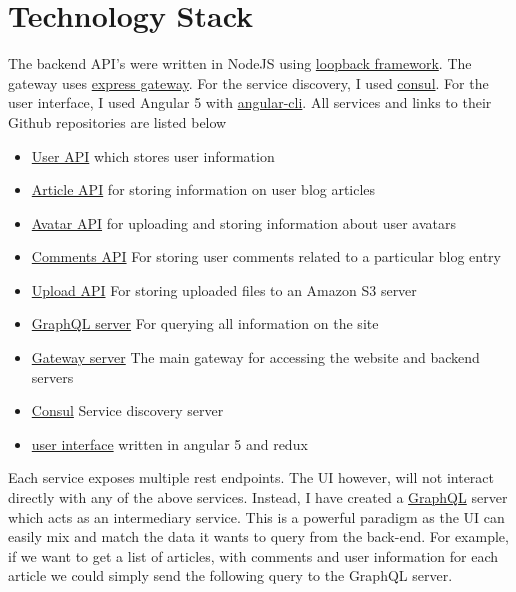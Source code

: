 \section{Technology Stack}

The backend API's were written in NodeJS using \href{https://loopback.io}{loopback framework}. The gateway uses \href{https://www.express-gateway.io/}{express gateway}. For the service discovery, I used \href{https://www.consul.io/}{consul}. For the user interface, I used Angular 5 with \href{https://cli.angular.io/}{angular-cli}. All services and links to their Github repositories are listed below

\begin{itemize}
  \item \href{https://github.com/msc-blog-assignment/msc-blog-user-api}{User API} which stores user information
  \item \href{https://github.com/msc-blog-assignment/msc-blog-article-api}{Article API} for storing information on user blog articles
  \item \href{https://github.com/msc-blog-assignment/msc-blog-avatar-api}{Avatar API} for uploading and storing information about user avatars
  \item \href{https://github.com/msc-blog-assignment/msc-blog-comments-api}{Comments API} For storing user comments related to a particular blog entry
  \item \href{https://github.com/msc-blog-assignment/msc-blog-upload-api}{Upload API} For storing uploaded files to an Amazon S3 server
  \item \href{https://github.com/msc-blog-assignment/msc-blog-graphql}{GraphQL server} For querying all information on the site
  \item \href{https://github.com/msc-blog-assignment/msc-blog-gateway}{Gateway server} The main gateway for accessing the website and backend servers
  \item \href{https://github.com/msc-blog-assignment/msc-blog-consul}{Consul} Service discovery server
  \item \href{https://github.com/msc-blog-assignment/msc-blog-ui}{user interface} written in angular 5 and redux
\end{itemize}
Each service exposes multiple rest endpoints. The UI however, will not interact directly with any of the above services. Instead, I have created a \href{https://graphql.org/learn/}{GraphQL} server which acts as an intermediary service. This is a powerful paradigm as the UI can easily mix and match the data it wants to query from the back-end. For example, if we want to get a list of articles, with comments and user information for each article we could simply send the following query to the GraphQL server.

